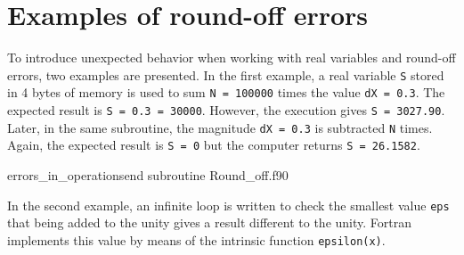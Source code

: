     

%







    \newpage    
    \section{Examples of round-off errors} 
    
To introduce unexpected behavior when working with real variables and round-off errors, 
two examples are presented.   
In the first example, a real variable \texttt{S} stored in 4 bytes of memory is used to sum \texttt{N = 100000}
times the value \texttt{dX = 0.3}. The expected result is \texttt{S = 0.3  = 30000}. 
However, the execution gives \texttt{S = 3027.90}. Later, in the same subroutine, the magnitude   
\texttt{dX = 0.3} is subtracted \texttt{N} times. Again, the expected result is  \texttt{S = 0}
but the computer returns \texttt{S = 26.1582}.

\vspace{0.5cm}
{errors_in_operations}{end subroutine}
{Round_off.f90} 

\newpage
In the second example, an infinite loop is written to check the smallest value \texttt{eps} 
that being added to the unity gives a result different to the unity.  
Fortran implements this value by means of the intrinsic function \texttt{epsilon(x)}.

